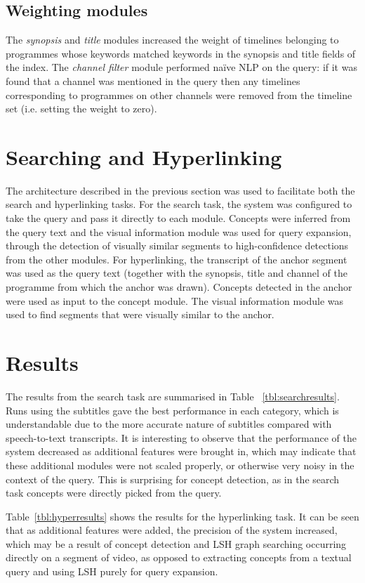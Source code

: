 \documentclass{../acm_proc_article-me11_tweaked}
\begin{document}
\subsection{Weighting modules}
The \emph{synopsis} and \emph{title} modules increased the weight of timelines belonging to programmes whose keywords matched keywords in the synopsis and title fields of the index. The \emph{channel filter} module performed naïve NLP on the query: if it was found that a channel was mentioned in the query then any 
timelines corresponding to programmes on other channels were removed from the 
timeline set (i.e. setting the weight to zero).

\section{Searching and Hyperlinking}
The architecture described in the previous section was used to facilitate both the search and hyperlinking tasks. For the search task, the system was configured to take the query and pass it directly to each module. Concepts were inferred from the 
query text and the visual information module was used for query expansion, through the detection of visually similar segments to high-confidence detections from the other modules. For hyperlinking, the transcript of the anchor segment was used as the query text (together with the synopsis, title and channel of the programme from which the anchor was drawn). Concepts detected in the anchor were used as input to the concept module. The visual information module was used to find segments that were visually similar to the anchor. 

\section{Results}
The results from the search task are summarised in Table~
\ref{tbl:searchresults}. Runs using the subtitles gave the best performance in 
each category, which is understandable due to the more accurate nature of 
subtitles compared with speech-to-text transcripts. It is interesting to 
observe that the performance of the system decreased as additional features 
were brought in, which may indicate that these additional modules were not 
scaled properly, or otherwise very noisy in the context of the query. This is 
surprising for concept detection, as in the search task concepts were directly 
picked from the query.

Table~\ref{tbl:hyperresults} shows the results for the hyperlinking 
task. It can be seen that as additional features were added, the 
precision of the system increased, which may be a result of concept detection 
and LSH graph searching occurring directly on a segment of video, as opposed to 
extracting concepts from a textual query and using LSH purely for 
query expansion. 
\end{document}
